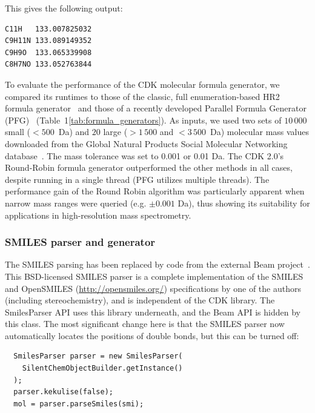 \documentclass[10pt]{bmcart}
\def \cdkversion {2.0}
\begin{document}
This gives the following output:

\vspace{0.2cm}
\begin{verbatim}
C11H   133.007825032
C9H11N 133.089149352
C9H9O  133.065339908
C8H7NO 133.052763844
\end{verbatim}
\vspace{0.2cm}

 To evaluate the performance of the CDK molecular formula generator, we
compared its runtimes to those of the classic, full enumeration-based HR2
formula generator~\cite{Kind2007} and those of a recently developed Parallel
Formula Generator (PFG)~\cite{Zhang2016} (Table~1\ref{tab:formula_generators}).
As inputs, we used two sets of $10\,000$ small ($< 500$~Da) and $20$ large ($>
1\,500$ and $< 3\,500$~Da) molecular mass values downloaded from the Global
Natural Products Social Molecular Networking database~\cite{wang2016}. The mass
tolerance was set to 0.001 or 0.01 Da. The CDK \cdkversion{}'s Round-Robin 
formula generator outperformed the other methods in all cases, despite running
in a single thread (PFG utilizes multiple threads). The performance gain of
the Round Robin algorithm was particularly apparent when narrow mass ranges 
were queried (e.g. $\pm 0.001$ Da), thus showing its suitability for
applications in high-resolution mass spectrometry.

\subsubsection*{SMILES parser and generator}

The SMILES parsing has been replaced by code from the external Beam project~\cite{Beam}.
This BSD-licensed SMILES parser is a complete implementation of the SMILES
and OpenSMILES (\url{http://opensmiles.org/}) specifications by one of the
authors (including stereochemistry), and is independent of
the CDK library. The SmilesParser API uses this library underneath, and the
Beam API is hidden by this class. The most significant change here is that
the SMILES parser now automatically locates the positions of double bonds,
but this can be turned off:

\vspace{0.2cm}
\begin{verbatim}
  SmilesParser parser = new SmilesParser(
    SilentChemObjectBuilder.getInstance()
  );
  parser.kekulise(false);
  mol = parser.parseSmiles(smi);
\end{verbatim}
\vspace{0.2cm}
\end{document}
